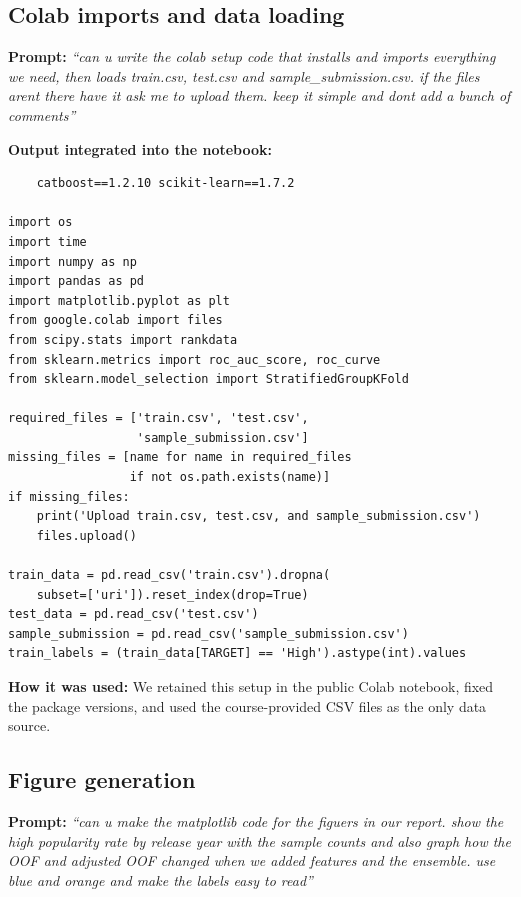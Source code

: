 \documentclass{article}
\begin{document}
\subsection{Colab imports and data loading}
\noindent\textbf{Prompt:}
\emph{``can u write the colab setup code that installs and imports everything
we need, then loads train.csv, test.csv and sample\_submission.csv. if the
files arent there have it ask me to upload them. keep it simple and dont add a
bunch of comments''}

\noindent\textbf{Output integrated into the notebook:}
\begin{lstlisting}[basicstyle=\ttfamily\scriptsize,breaklines=true]
%pip install -q lightgbm==4.6.0 xgboost==3.2.0 \
    catboost==1.2.10 scikit-learn==1.7.2

import os
import time
import numpy as np
import pandas as pd
import matplotlib.pyplot as plt
from google.colab import files
from scipy.stats import rankdata
from sklearn.metrics import roc_auc_score, roc_curve
from sklearn.model_selection import StratifiedGroupKFold

required_files = ['train.csv', 'test.csv',
                  'sample_submission.csv']
missing_files = [name for name in required_files
                 if not os.path.exists(name)]
if missing_files:
    print('Upload train.csv, test.csv, and sample_submission.csv')
    files.upload()

train_data = pd.read_csv('train.csv').dropna(
    subset=['uri']).reset_index(drop=True)
test_data = pd.read_csv('test.csv')
sample_submission = pd.read_csv('sample_submission.csv')
train_labels = (train_data[TARGET] == 'High').astype(int).values
\end{lstlisting}

\noindent\textbf{How it was used:}
We retained this setup in the public Colab notebook, fixed the package
versions, and used the course-provided CSV files as the only data source.

\subsection{Figure generation}
\noindent\textbf{Prompt:}
\emph{``can u make the matplotlib code for the figuers in our report. show the
high popularity rate by release year with the sample counts and also graph how
the OOF and adjusted OOF changed when we added features and the ensemble. use
blue and orange and make the labels easy to read''}
\end{document}
